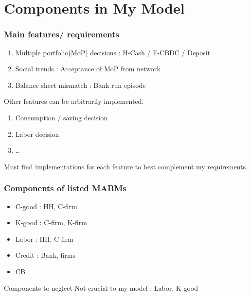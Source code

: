 \section{Components in My Model}

\begin{frame}
    \frametitle{Main features/ requirements}

    \begin{enumerate}
        \item Multiple portfolio(MoP) decisions : H-Cash / F-CBDC / Deposit
        \item Social trends : Acceptance of MoP from network
        \item Balance sheet mismatch : Bank run episode
    \end{enumerate}

    \vfill

    Other features can be arbitrarily implemented.
    \begin{enumerate}
        \item Consumption / saving decision 
        \item Labor decision 
        \item \dots
    \end{enumerate}
    
    Must find implementations for each feature to best complement my requirements.

\end{frame}


\begin{frame}
    \frametitle{Components of listed MABMs}

    \begin{itemize}
        \item C-good : HH, C-firm
        \item K-good : C-firm, K-firm
        \item Labor  : HH, C-firm
        \item Credit : Bank, firms
        \item CB
    \end{itemize}

    \begin{block}{Components to neglect}
        Not crucial to my model : Labor, K-good        
    \end{block}

\end{frame}

